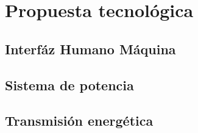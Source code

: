 
\chapter{Propuesta tecnol\'ogica} %

\label{Chapter3} %




\section{Interf\'az Humano M\'aquina}
\section{Sistema de potencia}
\section{Transmisi\'on energ\'etica}

